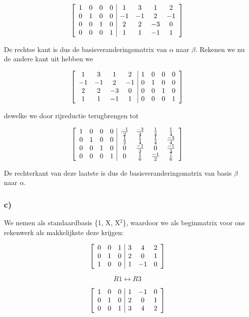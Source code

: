 \documentclass[lineaire_algebra_oplossingen.tex]{subfiles}
\begin{document}
\[
\left[
\begin{array}{ c c c c | c c c c }
1 & 0 & 0 & 0 & 1 & 3 & 1 & 2\\
0 & 1 & 0 & 0 & -1 & -1 & 2 & -1\\
0 & 0 & 1 & 0 & 2 & 2 & -3 & 0\\
0 & 0 & 0 & 1 & 1 & 1 & -1 & 1
\end{array}
\right]
\]

De rechtse kant is dus de basisveranderingsmatrix van $\alpha$ naar $\beta$. Rekenen we nu de andere kant uit hebben we

\[
\left[
\begin{array}{ c c c c | c c c c }
1 & 3 & 1 & 2 & 1 & 0 & 0 & 0\\
-1 & -1 & 2 & -1 & 0 & 1 & 0 & 0\\
2 & 2 & -3 & 0 & 0 & 0 & 1 & 0\\
1 & 1 & -1 & 1 & 0 & 0 & 0 & 1
\end{array}
\right]
\]

dewelke we door rijreductie terugbrengen tot

\[
\left[
\begin{array}{ c c c c | c c c c }
1 & 0 & 0 & 0 & \frac{-1}{2} & \frac{-3}{4} & \frac{1}{4} & \frac{1}{4}\\
0 & 1 & 0 & 0 & \frac{1}{2} & \frac{1}{4} & \frac{1}{4} & \frac{-3}{4}\\
0 & 0 & 1 & 0 & 0 & \frac{-1}{3} & 0 & \frac{-1}{3}\\
0 & 0 & 0 & 1 & 0 & \frac{1}{6} & \frac{-1}{2} & \frac{7}{6}
\end{array}
\right]
\]

De rechterkant van deze laatste is dus de basisveranderingsmatrix van basis $\beta$ naar $\alpha$.

\subsubsection*{c)}
We nemen als standaardbasis \{1, X, X$^2$\}, waardoor we als beginmatrix voor ons rekenwerk als makkelijkste deze krijgen:

\[
\left[
\begin{array}{ c c c | c c c }
0 & 0 & 1 & 3 & 4 & 2\\
0 & 1 & 0 & 2 & 0 & 1\\
1 & 0 & 0 & 1 & -1 & 0
\end{array}
\right]
\]

\[R1 \leftrightarrow R3 \]

\[
\left[
\begin{array}{ c c c | c c c }
1 & 0 & 0 & 1 & -1 & 0\\
0 & 1 & 0 & 2 & 0 & 1\\
0 & 0 & 1 & 3 & 4 & 2
\end{array}
\right]
\]
\end{document}
